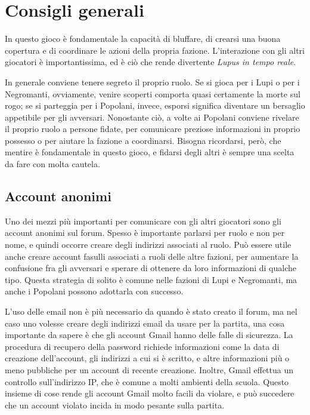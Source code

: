 \documentclass[a4paper,10pt]{article}
\begin{document}
\section{Consigli generali}

In questo gioco è fondamentale la capacità di bluffare, di crearsi una buona copertura e di coordinare le azioni della propria fazione. L'interazione con gli altri giocatori è importantissima, ed è ciò che rende divertente \emph{Lupus in tempo reale}.

In generale conviene tenere segreto il proprio ruolo. Se si gioca per i Lupi o per i Negromanti, ovviamente, venire scoperti comporta quasi certamente la morte sul rogo; se si parteggia per i Popolani, invece, esporsi significa diventare un bersaglio appetibile per gli avversari. Nonostante ciò, a volte ai Popolani conviene rivelare il proprio ruolo a persone fidate, per comunicare preziose informazioni in proprio possesso o per aiutare la fazione a coordinarsi. Bisogna ricordarsi, però, che mentire è fondamentale in questo gioco, e fidarsi degli altri è sempre una scelta da fare con molta cautela.

\subsection{Account anonimi}

Uno dei mezzi più importanti per comunicare con gli altri giocatori sono gli account anonimi sul forum. Spesso è importante parlarsi per ruolo e non per nome, e quindi occorre creare degli indirizzi associati al ruolo. Può essere utile anche creare account fasulli associati a ruoli delle altre fazioni, per aumentare la confusione fra gli avversari e sperare di ottenere da loro informazioni di qualche tipo. Questa strategia di solito è comune nelle fazioni di Lupi e Negromanti, ma anche i Popolani possono adottarla con successo.

L'uso delle email non è più necessario da quando è stato creato il forum, ma nel caso uno volesse creare degli indirizzi email da usare per la partita, una cosa importante da sapere è che gli account Gmail hanno delle falle di sicurezza. La procedura di recupero della password richiede informazioni come la data di creazione dell'account, gli indirizzi a cui si è scritto, e altre informazioni più o meno pubbliche per un account di recente creazione. Inoltre, Gmail effettua un controllo sull'indirizzo IP, che è comune a molti ambienti della scuola. Questo insieme di cose rende gli account Gmail molto facili da violare, e può succedere che un account violato incida in modo pesante sulla partita.
\end{document}
